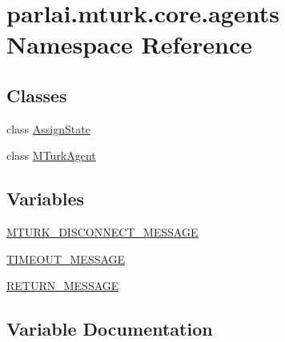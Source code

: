 \hypertarget{namespaceparlai_1_1mturk_1_1core_1_1agents}{}\section{parlai.\+mturk.\+core.\+agents Namespace Reference}
\label{namespaceparlai_1_1mturk_1_1core_1_1agents}
\subsection*{Classes}
\begin{DoxyCompactItemize}
\item 
class \hyperlink{classparlai_1_1mturk_1_1core_1_1agents_1_1AssignState}{Assign\+State}
\item 
class \hyperlink{classparlai_1_1mturk_1_1core_1_1agents_1_1MTurkAgent}{M\+Turk\+Agent}
\end{DoxyCompactItemize}
\subsection*{Variables}
\begin{DoxyCompactItemize}
\item 
\hyperlink{namespaceparlai_1_1mturk_1_1core_1_1agents_adfd36f5899ccae96747a6813c794cac8}{M\+T\+U\+R\+K\+\_\+\+D\+I\+S\+C\+O\+N\+N\+E\+C\+T\+\_\+\+M\+E\+S\+S\+A\+GE}
\item 
\hyperlink{namespaceparlai_1_1mturk_1_1core_1_1agents_a8d1e3bd49a3abe7115edfd1c72eb15c5}{T\+I\+M\+E\+O\+U\+T\+\_\+\+M\+E\+S\+S\+A\+GE}
\item 
\hyperlink{namespaceparlai_1_1mturk_1_1core_1_1agents_adffa5e1ab7f16421528a7ee68657526c}{R\+E\+T\+U\+R\+N\+\_\+\+M\+E\+S\+S\+A\+GE}
\end{DoxyCompactItemize}


\subsection{Variable Documentation}
\mbox{\label{namespaceparlai_1_1mturk_1_1core_1_1agents_adfd36f5899ccae96747a6813c794cac8}} 
